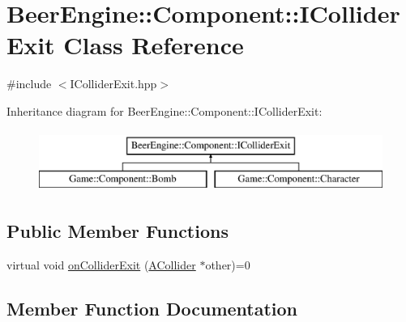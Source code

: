 \hypertarget{class_beer_engine_1_1_component_1_1_i_collider_exit}{}\section{Beer\+Engine\+:\+:Component\+:\+:I\+Collider\+Exit Class Reference}
\label{class_beer_engine_1_1_component_1_1_i_collider_exit}


{\ttfamily \#include $<$I\+Collider\+Exit.\+hpp$>$}

Inheritance diagram for Beer\+Engine\+:\+:Component\+:\+:I\+Collider\+Exit\+:\begin{figure}[H]
\begin{center}
\leavevmode
\includegraphics[height=2.000000cm]{class_beer_engine_1_1_component_1_1_i_collider_exit}
\end{center}
\end{figure}
\subsection*{Public Member Functions}
\begin{DoxyCompactItemize}
\item 
virtual void \mbox{\hyperlink{class_beer_engine_1_1_component_1_1_i_collider_exit_a3669477d0003535fbe0411449efc69e9}{on\+Collider\+Exit}} (\mbox{\hyperlink{class_beer_engine_1_1_component_1_1_a_collider}{A\+Collider}} $\ast$other)=0
\end{DoxyCompactItemize}


\subsection{Member Function Documentation}
\mbox{\label{class_beer_engine_1_1_component_1_1_i_collider_exit_a3669477d0003535fbe0411449efc69e9}} 
